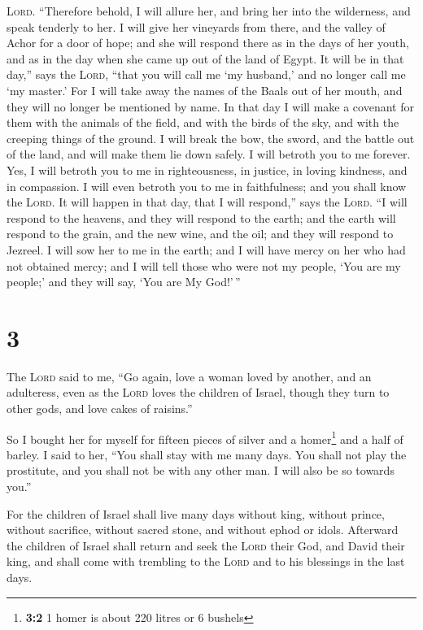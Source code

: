\textsc{Lord}.  ``Therefore behold, I will allure her,
and bring her into the wilderness, and speak tenderly to her.
 I will give her vineyards from there, and the valley of
Achor for a door of hope; and she will respond there as in the days of
her youth, and as in the day when she came up out of the land of Egypt.
 It will be in that day,'' says the \textsc{Lord}, ``that
you will call me `my husband,' and no longer call me `my master.'
 For I will take away the names of the Baals out of her
mouth, and they will no longer be mentioned by name.  In
that day I will make a covenant for them with the animals of the field,
and with the birds of the sky, and with the creeping things of the
ground. I will break the bow, the sword, and the battle out of the land,
and will make them lie down safely.  I will betroth you
to me forever. Yes, I will betroth you to me in righteousness, in
justice, in loving kindness, and in compassion.  I will
even betroth you to me in faithfulness; and you shall know the
\textsc{Lord}.  It will happen in that day, that I will
respond,'' says the \textsc{Lord}. ``I will respond to the heavens, and
they will respond to the earth;  and the earth will
respond to the grain, and the new wine, and the oil; and they will
respond to Jezreel.  I will sow her to me in the earth;
and I will have mercy on her who had not obtained mercy; and I will tell
those who were not my people, `You are my people;' and they will say,
`You are My God!'\,''

\hypertarget{section-2}{%
\section{3}\label{section-2}}

 The \textsc{Lord} said to me, ``Go again, love a woman
loved by another, and an adulteress, even as the \textsc{Lord} loves the
children of Israel, though they turn to other gods, and love cakes of
raisins.''

 So I bought her for myself for fifteen pieces of silver
and a homer\footnote{\textbf{3:2} 1 homer is about 220 litres or 6
  bushels} and a half of barley.  I said to her, ``You
shall stay with me many days. You shall not play the prostitute, and you
shall not be with any other man. I will also be so towards you.''

 For the children of Israel shall live many days without
king, without prince, without sacrifice, without sacred stone, and
without ephod or idols.  Afterward the children of Israel
shall return and seek the \textsc{Lord} their God, and David their king,
and shall come with trembling to the \textsc{Lord} and to his blessings
in the last days.

